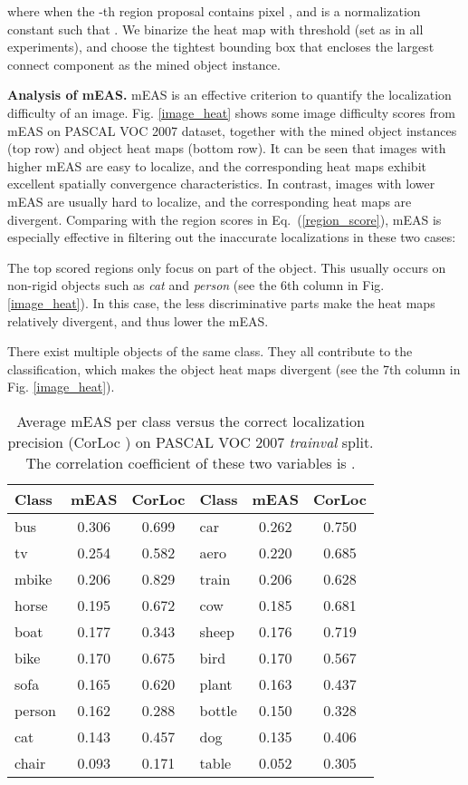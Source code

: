 \documentclass[10pt,twocolumn,letterpaper]{article}
\begin{document}
where  when the -th region proposal contains pixel , and  is a normalization constant such that . We binarize the heat map  with threshold  (set as  in all experiments), and choose the tightest bounding box that encloses the largest connect component as the mined object instance.

\textbf{Analysis of mEAS.} mEAS is an effective criterion to quantify the localization difficulty of an image. Fig. \ref{image_heat} shows some image difficulty scores from mEAS on PASCAL VOC 2007 dataset, together with the mined object instances (top row) and object heat maps (bottom row). It can be seen that images with higher mEAS are easy to localize, and the corresponding heat maps exhibit excellent spatially convergence characteristics. In contrast, images with lower mEAS are usually hard to localize, and the corresponding heat maps are divergent. Comparing with the region scores in Eq.~(\ref{region_score}), mEAS is especially effective in filtering out the inaccurate localizations in these two cases:

 The top scored regions only focus on part of the object. This usually occurs on non-rigid objects such as \textit{cat} and \textit{person} (see the 6th column in Fig. \ref{image_heat}). In this case, the less discriminative parts make the heat maps relatively divergent, and thus lower the mEAS.

 There exist multiple objects of the same class. They all contribute to the classification, which makes the object heat maps divergent (see the 7th column in Fig. \ref{image_heat}).

\begin{table}[t]
\caption{Average mEAS per class versus the correct localization precision (CorLoc \cite{deselaers2012weakly}) on PASCAL VOC 2007 \emph{trainval} split. The correlation coefficient of these two variables is . } \label{meas_loc}
\vspace{0.1cm}
\footnotesize
\setlength\tabcolsep{8.2pt}
\begin{tabular}{|l|c|c||l|c|c|}
\hline
Class  &mEAS &CorLoc  &Class&mEAS &CorLoc    \\ \hline
bus   &0.306&0.699&car   &0.262&0.750 \\ \hline
tv    &0.254&0.582&aero  &0.220&0.685 \\ \hline
mbike &0.206&0.829&train &0.206&0.628 \\ \hline
horse &0.195&0.672&cow   &0.185&0.681 \\ \hline
boat  &0.177&0.343&sheep &0.176&0.719 \\ \hline
bike  &0.170&0.675&bird  &0.170&0.567 \\ \hline
sofa  &0.165&0.620&plant &0.163&0.437 \\ \hline
person&0.162&0.288&bottle&0.150&0.328 \\ \hline
cat   &0.143&0.457&dog   &0.135&0.406 \\ \hline
chair &0.093&0.171&table &0.052&0.305 \\ \hline
\end{tabular}
\vspace{-0.1cm}
\end{table}
\end{document}
